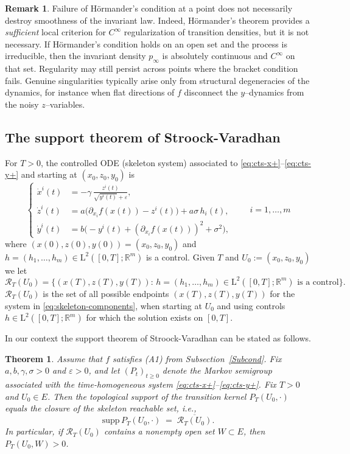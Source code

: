 \documentclass[11pt, a4paper,leqno]{amsart}
\newtheorem{theorem}{Theorem}[section]
\theoremstyle{definition}
\newtheorem{remark}{Remark}[section]
\numberwithin{equation}{section}
\newcommand{\R}{\mathbb R}
\begin{document}
\begin{remark}
Failure of Hörmander’s condition at a point does not necessarily destroy smoothness of the invariant law.
Indeed, Hörmander’s theorem provides a \emph{sufficient} local criterion for $C^\infty$ regularization of transition
densities, but it is not necessary. If Hörmander’s condition holds on an open set and the process is irreducible,
then the invariant density $p_\infty$ is absolutely continuous and $C^\infty$ on that set. Regularity may still
persist across points where the bracket condition fails. Genuine singularities typically arise only from
structural degeneracies of the dynamics, for instance when flat directions of $f$ disconnect the $y$–dynamics
from the noisy $z$–variables.
\end{remark}




\subsection{The support theorem of Stroock-Varadhan}   For $T>0$, the controlled ODE (skeleton system) associated to \eqref{eq:cts-x+}–\eqref{eq:cts-y+} and starting at $(x_0,z_0,y_0)$ is
\begin{equation}\label{eq:skeleton-components}
\left\{
\begin{aligned}
\dot x^i(t) &= -\gamma\,\frac{z^i(t)}{\sqrt{y^i(t)}+\varepsilon},\\
\dot z^i(t) &= a\big(\partial_{x_i}f(x(t)) - z^i(t)\big) + a\sigma\,h_i(t),\\
\dot y^i(t) &= b\big(-y^i(t) + (\partial_{x_i}f(x(t)))^2 + \sigma^2\big),
\end{aligned}\right.
\qquad i=1,\dots,m
\end{equation}
where $(x(0),z(0),y(0))=(x_0,z_0,y_0)$ and  $h=(h_1,\dots,h_m)\in \mathrm L^2([0,T];\R^m)$ is a control.
Given $T$ and $U_0:=(x_0,z_0,y_0)$ we let
$$\mathcal R_T(U_0)=\bigl\{(x(T),z(T),y(T)):\,\mbox{$h=(h_1,\dots,h_m)\in \mathrm L^2([0,T];\R^m)$ is a control}\bigr\}.$$
$\mathcal R_T(U_0)$ is the set of all possible endpoints $(x(T),z(T),y(T))$ for the system in \eqref{eq:skeleton-components}, when starting at $U_0$ and using controls $h\in \mathrm L^2([0,T];\R^m)$ for which the solution exists on $[0,T]$.

In our context the support theorem of Stroock-Varadhan \cite{StroockVaradhan1979} can be stated as follows.

\begin{theorem}\label{thm:support} Assume that $f$ satisfies \textnormal{(A1)}  from Subsection~\ref{Subcond}.
Fix $a,b,\gamma,\sigma>0$ and $\varepsilon>0$, and let $(P_t)_{t\ge0}$ denote the Markov semigroup
associated with the time-homogeneous system \eqref{eq:cts-x+}–\eqref{eq:cts-y+}. Fix $T>0$ and $U_0\in E$. Then the topological support of the transition kernel $P_T(U_0,\cdot)$ equals the closure of the skeleton reachable set, i.e.,
\[
\mathrm{supp}\,P_T(U_0,\cdot) \;=\; \overline{\mathcal R_T(U_0)}.
\]
In particular, if $\mathcal R_T(U_0)$ contains a nonempty open set $W\subset E$, then $P_T(U_0,W)>0$.
\end{theorem}
\end{document}
